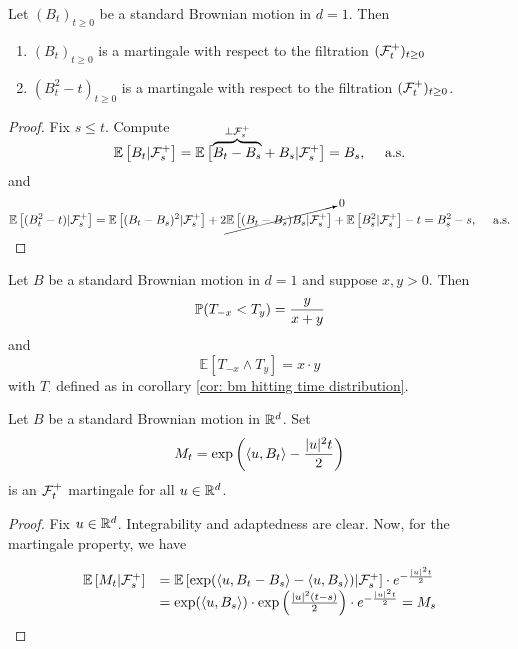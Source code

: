 \documentclass{article}
\begin{document}
\begin{theorem}\label{thm: bm martingales}
Let $ (B_{t})_{t\geq 0}$ be a standard Brownian motion in $ d=1$. Then 
\begin{enumerate}
	\item $ (B_{t})_{t\geq 0}$ is a martingale with respect to the filtration $ (\mathcal{F}^{+}_{t})_{t\geq 0}$ 
	\item  $(B_{t}^{2}-t)_{t\geq 0}$ is a martingale with respect to the filtration $ (\mathcal{F}^{+}_{t})_{t\geq 0}$. 
\end{enumerate}
\end{theorem}

\begin{proof}
	Fix $ s\leq t$. Compute 
	\[
		\mathbb{E}\left[ B_{t}| \mathcal{F}^{+}_{s} \right] = \mathbb{E}\left[ \smash{\overbrace{B_{t}-B_{s}}^{\perp \mathcal{F}^{+}_{s}}} + B_{s} |\mathcal{F}^{+}_{s} \right] = B_{s}, \quad \text{ a.s.}
	\]
	and 
	\[
		\mathbb{E}\left[ (B_{t}^{2}-t)| \F^{+}_{s} \right] = \mathbb{E}\left[ (B_{t}-B_{s})^2 |\F^+_{s} \right] + 2 \cancelto{0}{\mathbb{E}\left[ (B_{t}-B_{s})B_{s} |\F^{+}_{s} \right]}\\ 
	+ \mathbb{E}\left[ B^{2}_{s}|\F^{+}_{s} \right]-t = B^{2}_{s}-s, \quad \text{ a.s.}

	\]	
\end{proof}

\begin{boxcor}\label{cor: bm gambler's ruin}
Let $ B$ be a standard Brownian motion in $ d=1$ and suppose $ x,y>0$. Then 
\[
	\mathbb{P}(T_{-x}<T_{y}) = \frac{y}{x+y}
\]
and 
\[
 \mathbb{E}\left[ T_{-x}\land T_{y} \right] = x\cdot y
\]
with $ T_{\cdot}$ defined as in corollary \ref{cor: bm hitting time distribution}.
\end{boxcor}

\begin{boxprop}\label{prop: bm exp martingale}
Let $ B$ be a standard Brownian motion in $ \mathbb{R}^{d}$. Set 
\[
	M_{t} = \exp \left( \langle u, B_{t}\rangle-\frac{|u|^{2}t}{2} \right)
\]
is an $ \mathcal{F}^{+}_{t}$ martingale for all $ u\in \mathbb{R}^{d}$.
\end{boxprop}

\begin{proof}
    Fix $ u\in \mathbb{R}^{d}$. Integrability and adaptedness are clear. Now, for the martingale property, we have 
    
    \[
    \begin{array}{ll}
	    \mathbb{E}\left[ M_{t}|\mathcal{F}^{+}_{s} \right] &= \mathbb{E}\left[ \exp(\langle u, B_{t}-B_{s}\rangle-\langle u, B_{s}\rangle) |\mathcal{F}^{+}_{s}\right]\cdot e^{-\frac{|u|^{2}t}{2}}\\  
						      &= \exp(\langle u, B_{s}\rangle)\cdot \exp \left( \frac{|u|^{2}(t-s)}{2} \right)\cdot e^{-\frac{|u|^{2}t}{2}} = M_{s}
    \end{array}
    \]
\end{proof}
\end{document}
